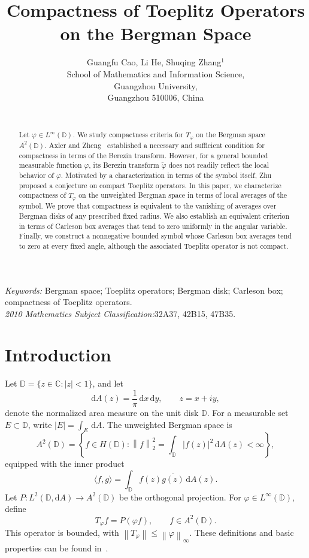 \documentclass[12pt,a4paper]{article}
\title{Compactness of Toeplitz Operators on the Bergman Space}
\author{%
Guangfu Cao, \hskip5mm Li He, \hskip5mm Shuqing Zhang$^1$\\
School of Mathematics and Information Science,\\
Guangzhou University,\\
Guangzhou 510006, China\\
\\[1ex]}
\date{}
\theoremstyle{remark}
\newcommand{\D}{\mathbb D}
\newcommand{\dd}{\,\mathrm d}
\newcommand{\dA}{\,\mathrm dA}
\newcommand{\A}{A^2(\D)}
\newcommand{\norm}[1]{\left\lVert#1\right\rVert}
\begin{document}
\maketitle
{}

\begin{abstract}
Let $\varphi\in L^\infty(\D)$. We study compactness criteria for \(T_\varphi\) on the Bergman space $A^2(\D)$. Axler and Zheng~\cite{AZ1998} established a necessary and sufficient condition for compactness in terms of the Berezin transform. However, for a general bounded measurable function $\varphi $, 
its Berezin transform $\tilde{\varphi}$ does not readily reflect the local behavior  of $\varphi$. Motivated by a characterization in terms of the symbol itself, Zhu~\cite{ZhuSlides} proposed a conjecture on compact Toeplitz operators. In this paper, we characterize compactness of $T_\varphi$ on the unweighted Bergman space in terms of local averages of the symbol. We prove that compactness is equivalent to the vanishing of averages over Bergman disks of any prescribed fixed radius. We also establish an equivalent criterion in terms of Carleson box averages that tend to zero uniformly in the angular variable. Finally, we construct a nonnegative bounded symbol whose Carleson box averages tend to zero at every fixed angle, although the associated Toeplitz operator is not compact. 
\end{abstract}
\noindent\textit{Keywords:} Bergman space; Toeplitz operators; Bergman disk; Carleson box; compactness of Toeplitz operators.\\
\noindent\textit{2010 Mathematics Subject Classification:}32A37, 42B15, 47B35.\\
\section{Introduction}
Let $\D=\{z\in\mathbb C:|z|<1\}$, and let
\[
\mathrm dA(z)=\frac1\pi\dd x\dd y,\qquad z=x+iy,
\]
denote the normalized area measure on the unit disk $\D$.
For a measurable set $E\subset\D$, write $|E|=\int_E\dA$. The unweighted Bergman space is
\[
\A=\left\{f\in H(\D):\norm f_2^2=\int_\D|f(z)|^2\dA(z)<\infty\right\},
\]
equipped with the inner product
\[
\langle f,g\rangle=\int_\D f(z)\overline{g(z)}\dA(z).
\]
Let $P:L^2(\D,\mathrm dA)\to\A$ be the orthogonal projection. For $\varphi\in L^\infty(\D)$, define
\[
T_\varphi f=P(\varphi f),\qquad f\in\A.
\]
This operator is bounded, with $\norm{T_\varphi}\le\norm\varphi_\infty$. These definitions and basic properties can be found in~\cite{ACM1982,HKZ2000,Zhu2007}.
\end{document}
